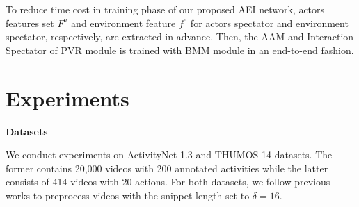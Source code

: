 \documentclass{bmvc2k}
\begin{document}
To reduce time cost in training phase of our proposed AEI network, actors features set $F^a$ and environment feature $f^e$ for actors spectator and environment spectator, respectively, are extracted in advance. Then, the AAM and Interaction Spectator of PVR module is trained with BMM module in an end-to-end fashion.

\section{Experiments}
\noindent
\textbf{Datasets}

\noindent
We conduct experiments on ActivityNet-1.3 \cite{caba2015activitynet} and THUMOS-14 \cite{THUMOS14} datasets. The former contains 20,000 videos with 200 annotated activities while the latter consists of 414 videos with 20 actions. For both datasets, we follow previous works \cite{lin2018bsn,bmn, dbg} to preprocess videos with the snippet length set to $\delta=16$.









\begin{table}[t]
\centering
\caption{\textbf{TAPG} comparisons in terms of AR@AN and AUC between our AEI and other SOTA methods on \textbf{ActivityNet-1.3}.}
\vspace*{0.2cm}
\label{activitynet_proposal1}
\end{table}
\end{document}
